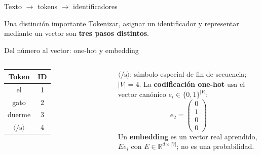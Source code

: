 \documentclass[aspectratio=169,10pt]{beamer}
\begin{document}
\begin{frame}{Texto $\to$ tokens $\to$ identificadores}
\centering{}\vspace{5mm}\begin{block}{Una distinción importante}
Tokenizar, asignar un identificador y representar mediante un vector son \textbf{tres pasos distintos}.
\end{block}
\end{frame}

\begin{frame}{Del número al vector: one-hot y embedding}
\begin{columns}
\begin{tabular}{cc}\toprule Token&ID\\\midrule el&1\\gato&2\\duerme&3\\$\langle/\mathrm s\rangle$&4\\\bottomrule\end{tabular}

\smallskip\scriptsize $\langle/\mathrm s\rangle$: símbolo especial de fin de secuencia; $|V|=4$.
La \textbf{codificación one-hot} usa el vector canónico $e_i\in\{0,1\}^{|V|}$:
\[e_2=\begin{pmatrix}0\\1\\0\\0\end{pmatrix}\]
Un \textbf{embedding} es un vector real aprendido, $Ee_i$ con $E\in\mathbb R^{d\times|V|}$; no es una probabilidad.
\end{columns}
\end{frame}
\end{document}
